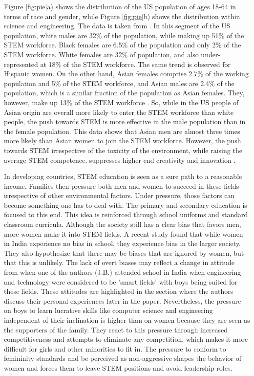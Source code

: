 \documentclass[utf8]{frontiersSCNS} %
\begin{document}
Figure \ref{fig:pie}a) shows the distribution of the US population of ages 18-64 in terms of race and gender, while Figure \ref{fig:pie}b) shows the distribution within science and engineering. The data is taken from \cite{guterl2014diversity}. In this segment of the US population, white males are 32\% of the population, while making up 51\% of the STEM workforce. Black females are 6.5\% of the population and only 2\% of the STEM workforce. White females are 32\% of population, and also under-represented at 18\% of the STEM workforce. The same trend is observed for Hispanic women.  On the other hand, Asian females comprise 2.7\% of the working population and 5\% of the STEM workforce, and Asian males are 2.4\% of the population, which is a similar fraction of the population as Asian females. They, however, make up 13\% of the STEM workforce \citep{guterl2014diversity}. So, while in the US people of Asian origin are overall more likely to enter the STEM workforce than white people, the push towards STEM is more effective in the male population than in the female population. This data shows that Asian men are almost three times more likely than Asian women to join the STEM workforce. However, the push towards STEM irrespective of the toxicity of the environment, while raising the average STEM competence, suppresses higher end creativity and innovation \citep{nager2016demographics}. 

In developing countries, STEM education is seen as a sure path to a reasonable income. Families then pressure both men and women to succeed in these fields irrespective of other environmental factors. Under pressure, those factors can become something one has to deal with.  The primary and secondary education is focused to this end. This idea is reinforced through school uniforms and standard classroom curricula. Although the society still has a clear bias that favors men, more women make it into STEM fields. A recent study \citep{escueta2013women} found that while women in India experience no bias in school, they experience bias in the larger society. They also hypothesize that there may be biases that are ignored by women, but that this is unlikely. The lack of overt biases may reflect a change in attitude from when one of the authors (J.B.) attended school in India when engineering and technology were considered to be 'smart fields' with boys being suited for these fields. These attitudes are highlighted in the section where the authors discuss their personal experiences later in the paper. Nevertheless, the pressure on boys to learn lucrative skills like computer science and engineering independent of their inclination is higher than on women because they are seen as the supporters of the family. They react to this pressure through increased competitiveness and attempts to eliminate any competition, which makes it more difficult for girls and other minorities to fit in. The pressure to conform to femininity standards and be perceived as non-aggressive shapes the behavior of women and forces them to leave STEM positions and avoid leadership roles.
\end{document}
